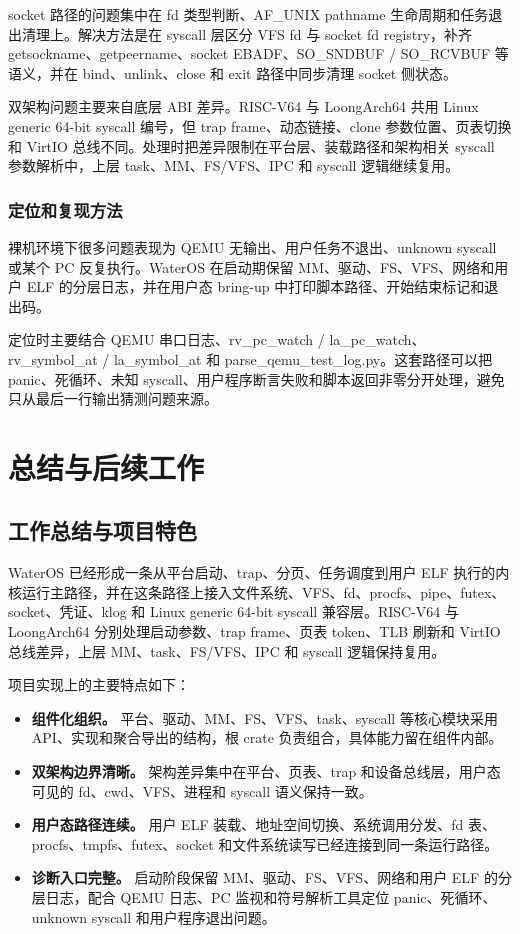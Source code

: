 \documentclass[12pt,openany,oneside,AutoFakeBold=true]{ctexbook}
\newcommand{\code}[1]{\textnormal{\rmfamily #1}}
\newcommand{\syscall}[1]{\textnormal{\rmfamily #1}}
\newcommand{\wosstrong}[1]{{\songti\bfseries #1}}
\begin{document}
socket 路径的问题集中在 fd 类型判断、AF\_UNIX pathname 生命周期和任务退出清理上。解决方法是在 syscall 层区分 VFS fd 与 socket fd registry，补齐 \syscall{getsockname}、\syscall{getpeername}、socket \code{EBADF}、\code{SO\_SNDBUF} / \code{SO\_RCVBUF} 等语义，并在 bind、unlink、close 和 exit 路径中同步清理 socket 侧状态。

双架构问题主要来自底层 ABI 差异。RISC-V64 与 LoongArch64 共用 Linux generic 64-bit syscall 编号，但 trap frame、动态链接、clone 参数位置、页表切换和 VirtIO 总线不同。处理时把差异限制在平台层、装载路径和架构相关 syscall 参数解析中，上层 task、MM、FS/VFS、IPC 和 syscall 逻辑继续复用。

\subsection{定位和复现方法}

裸机环境下很多问题表现为 QEMU 无输出、用户任务不退出、unknown syscall 或某个 PC 反复执行。WaterOS 在启动期保留 MM、驱动、FS、VFS、网络和用户 ELF 的分层日志，并在用户态 bring-up 中打印脚本路径、开始结束标记和退出码。

定位时主要结合 QEMU 串口日志、\code{rv\_pc\_watch} / \code{la\_pc\_watch}、\code{rv\_symbol\_at} / \code{la\_symbol\_at} 和 \code{parse\_qemu\_test\_log.py}。这套路径可以把 panic、死循环、未知 syscall、用户程序断言失败和脚本返回非零分开处理，避免只从最后一行输出猜测问题来源。

\chapter{总结与后续工作}

\section{工作总结与项目特色}

WaterOS 已经形成一条从平台启动、trap、分页、任务调度到用户 ELF 执行的内核运行主路径，并在这条路径上接入文件系统、VFS、fd、procfs、pipe、futex、socket、凭证、klog 和 Linux generic 64-bit syscall 兼容层。RISC-V64 与 LoongArch64 分别处理启动参数、trap frame、页表 token、TLB 刷新和 VirtIO 总线差异，上层 MM、task、FS/VFS、IPC 和 syscall 逻辑保持复用。

项目实现上的主要特点如下：

\begin{itemize}
  \item \wosstrong{组件化组织。} 平台、驱动、MM、FS、VFS、task、syscall 等核心模块采用 API、实现和聚合导出的结构，根 crate 负责组合，具体能力留在组件内部。
  \item \wosstrong{双架构边界清晰。} 架构差异集中在平台、页表、trap 和设备总线层，用户态可见的 fd、cwd、VFS、进程和 syscall 语义保持一致。
  \item \wosstrong{用户态路径连续。} 用户 ELF 装载、地址空间切换、系统调用分发、fd 表、procfs、tmpfs、futex、socket 和文件系统读写已经连接到同一条运行路径。
  \item \wosstrong{诊断入口完整。} 启动阶段保留 MM、驱动、FS、VFS、网络和用户 ELF 的分层日志，配合 QEMU 日志、PC 监视和符号解析工具定位 panic、死循环、unknown syscall 和用户程序退出问题。
\end{itemize}
\end{document}

